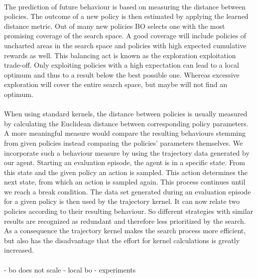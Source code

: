\\
The prediction of future behaviour is based on measuring the distance between policies. The outcome of a new policy is then estimated by applying the learned distance metric. Out of many new policies BO selects one with the most promising coverage of the search space. A good coverage will include policies of uncharted areas in the search space and policies with high expected cumulative rewards as well. This balancing act is known as the exploration exploitation trade-off. Only exploiting policies with a high expectation can lead to a local optimum and thus to a result below the best possible one. Whereas excessive exploration will cover the entire search space, but maybe will not find an optimum.\\
\\
When using standard kernels, the distance between policies is usually measured by calculating the Euclidean distance between corresponding policy parameters. A more meaningful measure would compare the resulting behaviours stemming from given policies instead comparing the policies' parameters themselves. We incorporate such a behaviour measure by using the trajectory data generated by our agent. Starting an evaluation episode, the agent is in a specific state. From this state and the given policy an action is sampled. This action determines the next state, from which an action is sampled again. This process continues until we reach a break condition. The data set generated during an evaluation episode for a given policy is then used by the trajectory kernel. It can now relate two policies according to their resulting behaviour. So different strategies with similar results are recognized as redundant and therefore less prioritized by the search. As a consequence the trajectory kernel makes the search process more efficient, but also has the disadvantage that the effort for kernel calculations is greatly increased.\\
\\

- bo does not scale
- local bo
- experiments \cite{sutton1998reinforcement}
